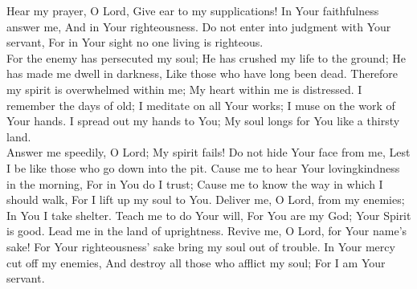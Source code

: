 
Hear my prayer, O Lord, Give ear to my supplications! In Your faithfulness answer me, And in Your righteousness. Do not enter into judgment with Your servant, For in Your sight no one living is righteous.\\

\noindent
For the enemy has persecuted my soul; He has crushed my life to the ground; He has made me dwell in darkness, Like those who have long been dead. Therefore my spirit is overwhelmed within me; My heart within me is distressed. I remember the days of old; I meditate on all Your works; I muse on the work of Your hands. I spread out my hands to You; My soul longs for You like a thirsty land.\\

\noindent
Answer me speedily, O Lord; My spirit fails! Do not hide Your face from me, Lest I be like those who go down into the pit. Cause me to hear Your lovingkindness in the morning, For in You do I trust; Cause me to know the way in which I should walk, For I lift up my soul to You. Deliver me, O Lord, from my enemies; In You I take shelter. Teach me to do Your will, For You are my God; Your Spirit is good. Lead me in the land of uprightness. Revive me, O Lord, for Your name's sake! For Your righteousness' sake bring my soul out of trouble. In Your mercy cut off my enemies, And destroy all those who afflict my soul; For I am Your servant.